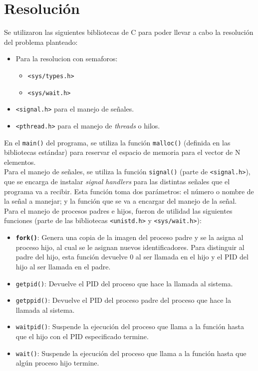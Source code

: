 \section{Resolución}

Se utilizaron las siguientes bibliotecas de C para poder llevar a cabo la resolución del problema planteado:
\begin{itemize}
    \item Para la resolucion con semaforos:
    \begin{itemize}
        \item \texttt{<sys/types.h>}
        \item \texttt{<sys/wait.h>}
    \end{itemize}
    \item \texttt{<signal.h>} para el manejo de señales.
    \item \texttt{<pthread.h>} para el manejo de \textit{threads} o hilos.\\
\end{itemize}

En el \texttt{main()} del programa, se utiliza la función \texttt{malloc()} (definida en las bibliotecas estándar) para reservar el espacio de memoria para el vector de N elementos.\\

Para el manejo de señales, se utiliza la función \texttt{signal()} (parte de \texttt{<signal.h>}), que se encarga de instalar \textit{signal handlers} para las distintas señales que el programa va a recibir. Esta función toma dos parámetros: el número o nombre de la señal a manejar; y la función que se va a encargar del manejo de la señal.\\ 

Para el manejo de procesos padres e hijos, fueron de utilidad las siguientes funciones (parte de las bibliotecas \texttt{<unistd.h>} y \texttt{<sys/wait.h>}):

\begin{itemize}
    \item \textbf{\texttt{fork()}}: Genera una copia de la imagen del proceso padre y se la asigna al proceso hijo, al cual se le asignan nuevos identificadores. Para distinguir al padre del hijo, esta función devuelve 0 al ser llamada en el hijo y el PID del hijo al ser llamada en el padre. 
    \item \texttt{getpid()}: Devuelve el PID del proceso que hace la llamada al sistema.
    \item \texttt{getppid()}: Devuelve el PID del proceso padre del proceso que hace la llamada al sistema.
    \item \texttt{waitpid()}: Suspende la ejecución del proceso que llama a la función hasta que el hijo con el PID especificado termine.
    \item \texttt{wait()}: Suspende la ejecución del proceso que llama a la función hasta que algún proceso hijo termine.\\
\end{itemize}

